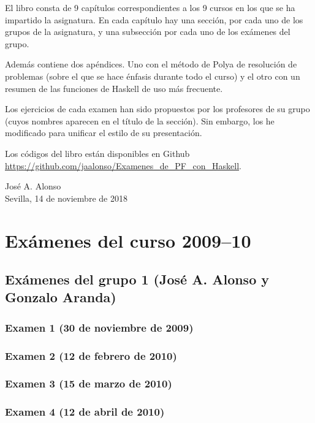 \documentclass[a4paper,12pt,twoside]{book}
\begin{document}
El libro consta de 9 capítulos correspondientes a los 9 cursos en los que
se ha impartido la asignatura. En cada capítulo hay una sección, por
cada uno de los grupos de la asignatura, y una subsección por cada uno de los
exámenes del grupo.  

Además contiene dos apéndices. Uno con el método de Polya de resolución de
problemas (sobre el que se hace énfasis durante todo el curso) y el otro con un
resumen de las funciones de Haskell de uso más frecuente.

Los ejercicios de cada examen han sido propuestos por los profesores de su
grupo (cuyos nombres aparecen en el título de la sección). Sin embargo, los he
modificado para unificar el estilo de su presentación.

Los códigos del libro están disponibles en Github
\href{https://github.com/jaalonso/Examenes_de_PF_con_Haskell}
     {\url{https://github.com/jaalonso/Examenes_de_PF_con_Haskell}}.

\begin{flushright}
  José A. Alonso \\
  Sevilla, 14 de noviembre de 2018
\end{flushright}

\chapter{Exámenes del curso 2009--10}

\section{Exámenes del grupo 1 (José A. Alonso y Gonzalo Aranda)}
\subsection{Examen 1 (30 de noviembre de 2009)}
\subsection{Examen 2 (12 de febrero de 2010)}
\subsection{Examen 3 (15 de marzo de 2010)}
\subsection{Examen 4 (12 de abril de 2010)} 
\end{document}
